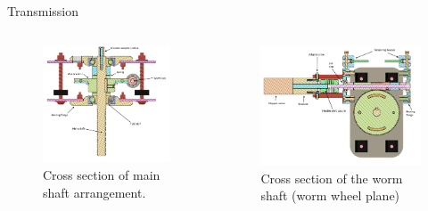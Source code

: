 \documentclass[11pt, aspectratio=169]{beamer}
\begin{document}
\begin{frame}{Transmission}
	\begin{columns}[t]
		\begin{column}{0.45\textwidth}
			\begin{figure}
				\centering
				\includegraphics[width=\textwidth]{figures/Mechanical/Gearbox_CS}
				\caption{Cross section of main shaft arrangement.}
				\label{img::mech2}
			\end{figure}
		\end{column}
		\begin{column}{0.45\textwidth}
			\begin{figure}
				\centering
				\includegraphics[width=\textwidth]{figures/Mechanical/Wormshaft_CS.png}
				\caption{Cross section of the worm shaft (worm wheel plane)}
				\label{img::mech3}
			\end{figure}
		\end{column}
	\end{columns}

\end{frame}
\end{document}
